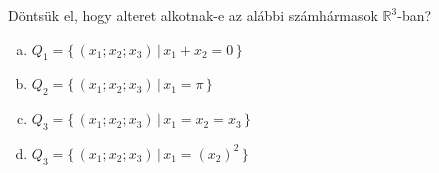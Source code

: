 \begin{exercise}{%
    Döntsük el, hogy alteret alkotnak-e az alábbi számhármasok
    $\mathbb R^3$-ban?
  }
  \newcommand{\setmap}[2]{\Big\{\, #1 \,\Big|\, #2 \,\Big\}}
  \begin{enumerate}[a)]
    \item $Q_1 = \setmap{(x_1; x_2; x_3)}{x_1 + x_2 = 0}$
    \item $Q_2 = \setmap{(x_1; x_2; x_3)}{x_1 = \pi}$
    \item $Q_3 = \setmap{(x_1; x_2; x_3)}{x_1 = x_2 = x_3}$
    \item $Q_3 = \setmap{(x_1; x_2; x_3)}{x_1 = (x_2)^2}$
  \end{enumerate}

\end{exercise}
